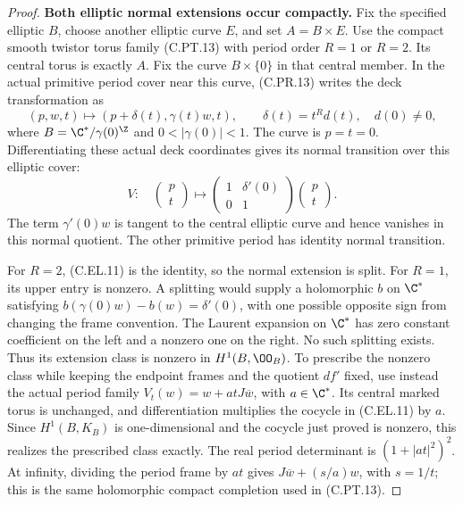 \begin{proof}
\par\medskip\noindent\textbf{Both elliptic normal extensions occur compactly.}
Fix the specified elliptic $B$, choose another elliptic curve
$E$, and set $A=B\times E$. Use the compact smooth twistor
torus family (C.PT.13) with period order $R=1$ or $R=2$.
Its central torus is exactly $A$. Fix the curve $B\times\{0\}$
in that central member. In the actual primitive period cover
near this curve, (C.PR.13) writes the deck transformation as
\[
 (p,w,t)\longmapsto
       (p+\delta(t),\gamma(t)w,t),\qquad
 \delta(t)=t^R d(t),\quad d(0)\ne0,
                                                        \tag{C.EL.10}
\]
where $B=\C^*/\gamma(0)^{\Z}$ and $0<|\gamma(0)|<1$.
The curve is $p=t=0$. Differentiating these actual deck
coordinates gives its normal transition over this elliptic
cover:
\[
 V:\quad
 \begin{pmatrix}p\\t\end{pmatrix}\longmapsto
 \begin{pmatrix}1&\delta'(0)\\0&1\end{pmatrix}
 \begin{pmatrix}p\\t\end{pmatrix}.
                                                        \tag{C.EL.11}
\]
The term $\gamma'(0)w$ is tangent to the central elliptic
curve and hence vanishes in this normal quotient. The other
primitive period has identity normal transition.

For $R=2$, (C.EL.11) is the identity, so the normal extension
is split. For $R=1$, its upper entry is nonzero. A splitting
would supply a holomorphic $b$ on $\C^*$ satisfying
$b(\gamma(0)w)-b(w)=\delta'(0)$, with one possible opposite
sign from changing the frame convention. The Laurent
expansion on $\C^*$ has zero constant coefficient on the
left and a nonzero one on the right. No such splitting
exists. Thus its extension class is nonzero in $H^1(B,\OO_B)$.
To prescribe the nonzero class while keeping the endpoint
frames and the quotient $df'$ fixed, use instead the actual
period family $V_t(w)=w+a tJ\overline w$, with $a\in\C^*$.
Its central marked torus is unchanged, and differentiation
multiplies the cocycle in (C.EL.11) by $a$. Since
$H^1(B,K_B)$ is one-dimensional and the cocycle just proved
is nonzero, this realizes the prescribed class exactly.
The real period determinant is $(1+|at|^2)^2$. At infinity,
dividing the period frame by $at$ gives
$J\overline w+(s/a)w$, with $s=1/t$; this is the same
holomorphic compact completion used in (C.PT.13).


\end{proof}
